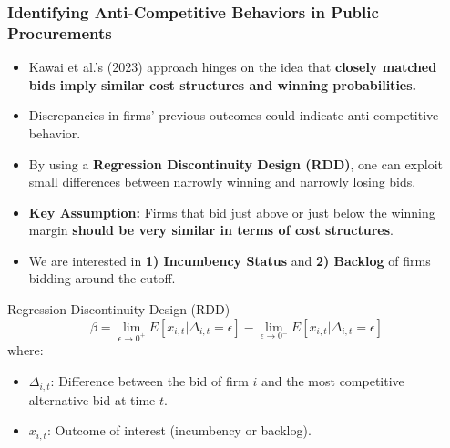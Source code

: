 \documentclass[12pt,english,xcolor=dvipsnames,aspectratio=1610]{beamer}
\begin{document}
\begin{frame}
\frametitle{Identifying Anti-Competitive Behaviors in Public Procurements}

\begin{itemize}
    \item Kawai et al.'s (2023) approach hinges on the idea that \textbf{closely matched bids imply similar cost structures and winning probabilities.}\vspace{2mm}
    \item Discrepancies in firms' previous outcomes could indicate anti-competitive behavior.\vspace{2mm}\pause
    \item By using a \textbf{Regression Discontinuity Design (RDD)}, one can exploit small differences between narrowly winning and narrowly losing bids.\vspace{2mm}
    \item \textbf{Key Assumption:} Firms that bid just above or just below the winning margin \textbf{ should be very similar in terms of cost structures}.\vspace{2mm}\pause
    \item We are interested in \textbf{1) Incumbency Status} and \textbf{2) Backlog} of firms bidding around the cutoff. 
    \end{itemize}
\end{frame}


\begin{frame}{Regression Discontinuity Design (RDD)}
    \[
    \beta = \lim_{\epsilon \to 0^+} E[x_{i,t} | \Delta_{i,t} = \epsilon] - \lim_{\epsilon \to 0^-} E[x_{i,t} | \Delta_{i,t} = \epsilon]
    \]
    where:
    \begin{itemize}
        \item \( \Delta_{i,t} \): Difference between the bid of firm \( i \) and the most competitive alternative bid at time \( t \).
        \item \( x_{i,t} \): Outcome of interest (incumbency or backlog).
    \end{itemize}
\end{frame}
\end{document}
